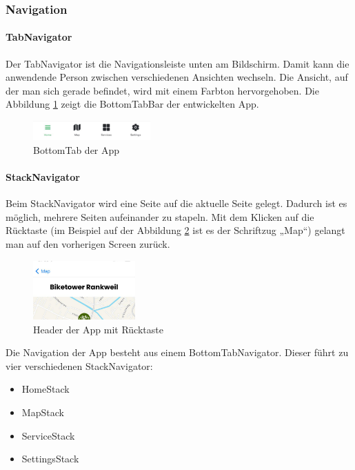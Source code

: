 \subsubsection{Navigation}
\paragraph{TabNavigator} Der \Gls{TabNavigator} ist die Navigationsleiste unten am Bildschirm. Damit kann die anwendende Person zwischen verschiedenen Ansichten wechseln. Die Ansicht, auf der man sich gerade befindet, wird mit einem Farbton hervorgehoben. Die Abbildung \ref{fig:bottomtab} zeigt die \Gls{BottomTabBar} der entwickelten App. 

\begin{figure}[H]
    \centering
    \includegraphics[width=0.4\textwidth]{images/tab.png}
    \caption{BottomTab der App}
    \label{fig:bottomtab}
\end{figure}

\paragraph{StackNavigator}Beim \Gls{StackNavigator} wird eine Seite auf die aktuelle Seite gelegt. Dadurch ist es möglich, mehrere Seiten aufeinander zu stapeln. Mit dem Klicken auf die Rücktaste (im Beispiel auf der Abbildung \ref{fig:appheader} ist es der Schriftzug „Map“) gelangt man auf den vorherigen Screen zurück. 

\begin{figure}[H]
    \centering
    \includegraphics[width=0.35\textwidth]{images/appheader.png}
    \caption{Header der App mit Rücktaste}
    \label{fig:appheader}
\end{figure}


Die Navigation der App besteht aus einem Bottom\Gls{TabNavigator}. Dieser führt zu vier verschiedenen \Gls{StackNavigator}:

\begin{itemize}
    \item HomeStack
    \item MapStack
    \item ServiceStack
    \item SettingsStack
\end{itemize}

